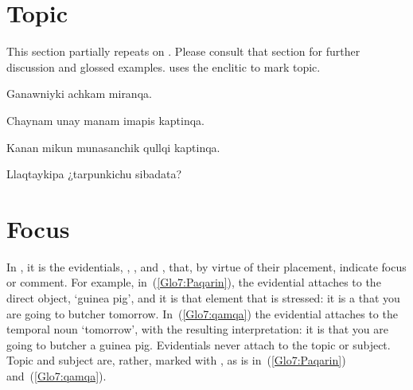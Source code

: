 \section{Topic}
This section partially repeats  on . Please consult that section for further discussion and glossed examples. \SYQ{} uses the enclitic  to mark topic.

%
{Ganawniyki achkam miranqa.}%
{}%
{}{}%

%
{Chaynam unay manam imapis kaptinqa.}%
{}%
{}{}%

%
{Kanan mikun munasanchik qullqi kaptinqa.}%
{}%
{}{}%

%
{Llaqtaykipa ¿tarpunkichu sibadata?}%
{}%
{}{}%

\section{Focus}\label{sec:emphasis}
In \SYQ, it is the evidentials, , , and , that, by virtue of their placement, indicate focus or comment. For example, in~(\ref{Glo7:Paqarin}), the evidential attaches to the direct object,  ‘guinea pig’, and it is that element that is stressed: it is a  that you are going to butcher tomorrow. In~(\ref{Glo7:qamqa}) the evidential attaches to the temporal noun  ‘tomorrow’, with the resulting interpretation: it is  that you are going to butcher a guinea pig. Evidentials never attach to the topic or subject. Topic and subject are, rather, marked with , as is  in~(\ref{Glo7:Paqarin}) and~(\ref{Glo7:qamqa}).

